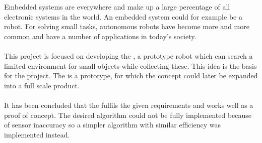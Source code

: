 Embedded systems are everywhere and make up a large percentage of all electronic systems in the world. An embedded system could for example be a robot. For solving small tasks, autonomous robots have become more and more common and have a number of applications in today's society.
\\\\
This project is focused on developing the \projname{}, a prototype robot which can search a limited environment for small objects while collecting these. This idea is the basis for the project. The \projname{} is a prototype, for which the concept could later be expanded into a full scale product.
\\\\
It has been concluded that the \projname{} fulfils the given requirements and works well as a proof of concept. The desired algorithm could not be fully implemented because of sensor inaccuracy so a simpler algorithm with similar efficiency was implemented instead.
